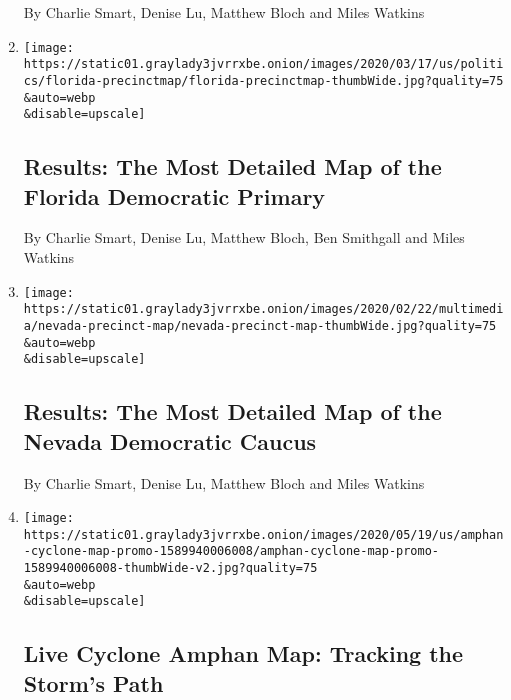 \begin{enumerate}
  By Charlie Smart, Denise Lu, Matthew Bloch and Miles Watkins
\item
  \href{/interactive/2020/03/17/us/elections/precinct-map-florida-primary.html}{}

  \texttt{[image: https://static01.graylady3jvrrxbe.onion/images/2020/03/17/us/politics/florida-precinctmap/florida-precinctmap-thumbWide.jpg?quality=75\\\&auto=webp\\\&disable=upscale]}

  \hypertarget{results-the-most-detailed-map-of-the-florida-democratic-primary}{%
  \subsection{Results: The Most Detailed Map of the Florida Democratic
  Primary}\label{results-the-most-detailed-map-of-the-florida-democratic-primary}}

  By Charlie Smart, Denise Lu, Matthew Bloch, Ben Smithgall and Miles
  Watkins
\item
  \href{/interactive/2020/02/22/us/elections/results-nevada-caucus-precinct-map.html}{}

  \texttt{[image: https://static01.graylady3jvrrxbe.onion/images/2020/02/22/multimedia/nevada-precinct-map/nevada-precinct-map-thumbWide.jpg?quality=75\\\&auto=webp\\\&disable=upscale]}

  \hypertarget{results-the-most-detailed-map-of-the-nevada-democratic-caucus}{%
  \subsection{Results: The Most Detailed Map of the Nevada Democratic
  Caucus}\label{results-the-most-detailed-map-of-the-nevada-democratic-caucus}}

  By Charlie Smart, Denise Lu, Matthew Bloch and Miles Watkins
\item
  \href{/interactive/2020/05/19/world/asia/amphan-cyclone-map.html}{}

  \texttt{[image: https://static01.graylady3jvrrxbe.onion/images/2020/05/19/us/amphan-cyclone-map-promo-1589940006008/amphan-cyclone-map-promo-1589940006008-thumbWide-v2.jpg?quality=75\\\&auto=webp\\\&disable=upscale]}

  \hypertarget{live-cyclone-amphan-map-tracking-the-storms-path}{%
  \subsection{Live Cyclone Amphan Map: Tracking the Storm's
  Path}\label{live-cyclone-amphan-map-tracking-the-storms-path}}


\end{enumerate}

